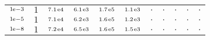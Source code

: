 \begin{tiny}
\begin{tabular}{@{$\;$}c@{$\;$}|@{$\;$}c@{$\;$}@{$\;$}c@{$\;$}@{$\;$}c@{$\;$}@{$\;$}c@{$\;$}@{$\;$}c@{$\;$}|@{$\;$}c@{$\;$}@{$\;$}c@{$\;$}@{$\;$}c@{$\;$}@{$\;$}c@{$\;$}@{$\;$}c@{$\;$}}
$\scriptstyle1\!\mathrm{\hspace{0.10em}e}-3$ & $\scriptstyle1$ & $\scriptstyle7.1\mathrm{\hspace{0.10em}e}4$ & $\scriptstyle6.1\mathrm{\hspace{0.10em}e}3$ & $\scriptstyle1.7\mathrm{\hspace{0.10em}e}5$ & $\scriptstyle1.1\mathrm{\hspace{0.10em}e}3$ & $\scriptstyle.$ & $\scriptstyle.$ & $\scriptstyle.$ & $\scriptstyle.$ & $\scriptstyle.$\\ 
$\scriptstyle1\!\mathrm{\hspace{0.10em}e}-5$ & $\scriptstyle1$ & $\scriptstyle7.1\mathrm{\hspace{0.10em}e}4$ & $\scriptstyle6.2\mathrm{\hspace{0.10em}e}3$ & $\scriptstyle1.6\mathrm{\hspace{0.10em}e}5$ & $\scriptstyle1.2\mathrm{\hspace{0.10em}e}3$ & $\scriptstyle.$ & $\scriptstyle.$ & $\scriptstyle.$ & $\scriptstyle.$ & $\scriptstyle.$\\ 
$\scriptstyle1\!\mathrm{\hspace{0.10em}e}-8$ & $\scriptstyle1$ & $\scriptstyle7.2\mathrm{\hspace{0.10em}e}4$ & $\scriptstyle6.5\mathrm{\hspace{0.10em}e}3$ & $\scriptstyle1.6\mathrm{\hspace{0.10em}e}5$ & $\scriptstyle1.5\mathrm{\hspace{0.10em}e}3$ & $\scriptstyle.$ & $\scriptstyle.$ & $\scriptstyle.$ & $\scriptstyle.$ & $\scriptstyle.$\\ 
\end{tabular} 
\end{tiny} 
